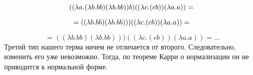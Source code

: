 \documentclass{article}
\date{}
\begin{document}
\maketitle

$$
((\lambda a.(\lambda b.b b) (\lambda b.b b)) b) ((\lambda c.(c b)) (\lambda a.a)) = \\ 
$$

$$
= ((\lambda b.b b) (\lambda b.b b))) ((\lambda c.(c b)) (\lambda a.a)) = \\
$$

$$
= ((\lambda b.b b) (\lambda b.b b))) ((\lambda c.(c b)) (\lambda a.a)) = ...
$$
Третий тип нашего терма ничем не отличается от второго. Следовательно, изменить его уже невозможно. Тогда, по теореме Карри о нормализации он не приводится к нормальной форме.
\end{document}
